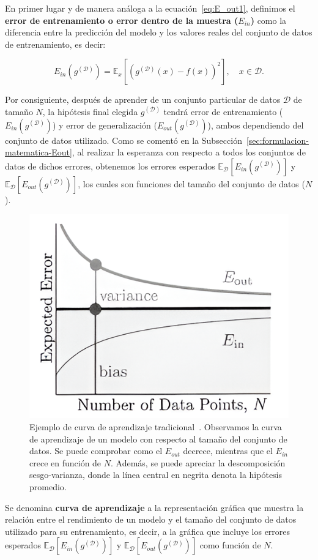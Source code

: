En primer lugar y de manera análoga a la ecuación~\eqref{eq:E_out1}, definimos el \textbf{error de entrenamiento o error dentro de la muestra ($E_{in}$)} como la diferencia entre la predicción del modelo y los valores reales del conjunto de datos de entrenamiento, es decir:

\begin{equation}\label{eq:E_in1}
    E_{in}(g^{\mathcal{(D)}}) = \mathbb{E}_{x}[{(g^{\mathcal{(D)}}(x) - f(x))}^2], \quad x \in \mathcal{D}.
\end{equation}

Por consiguiente, después de aprender de un conjunto particular de datos $\mathcal{D}$ de tamaño $N$, la hipótesis final elegida $g^{(\mathcal{D})}$ tendrá error de entrenamiento ($E_{in}(g^{(\mathcal{D})})$) y error de generalización ($E_{out}(g^{(\mathcal{D})})$), ambos dependiendo del conjunto de datos utilizado. Como se comentó en la Subsección~\ref{sec:formulacion-matematica-Eout}, al realizar la esperanza con respecto a todos los conjuntos de datos de dichos errores, obtenemos los errores esperados $\mathbb{E}_{\mathcal{D}}[E_{in}(g^{(\mathcal{D})})]$ y $\mathbb{E}_{\mathcal{D}}[E_{out}(g^{(\mathcal{D})})]$, los cuales son funciones del tamaño del conjunto de datos ($N$).

\begin{figure}[h]
    \centering
    \includegraphics[width=0.4\linewidth]{img/learning-curve.png}
    \caption[Ejemplo de curva de aprendizaje tradicional~\cite{Mostafa2012}.] {Ejemplo de curva de aprendizaje tradicional~\cite{Mostafa2012}. Observamos la curva de aprendizaje de un modelo con respecto al tamaño del conjunto de datos. Se puede comprobar como el $E_{out}$ decrece, mientras que el $E_{in}$ crece en función de $N$. Además, se puede apreciar la descomposición sesgo-varianza, donde la línea central en negrita denota la hipótesis promedio.}\label{fig:learning-curve-bias-variance}
\end{figure}

Se denomina \textbf{curva de aprendizaje} a la representación gráfica que muestra la relación entre el rendimiento de un modelo y el tamaño del conjunto de datos utilizado para su entrenamiento, es decir, a la gráfica que incluye los errores esperados $\mathbb{E}_{\mathcal{D}}[E_{in}(g^{(\mathcal{D})})]$ y $\mathbb{E}_{\mathcal{D}}[E_{out}(g^{(\mathcal{D})})]$ como función de $N$.

